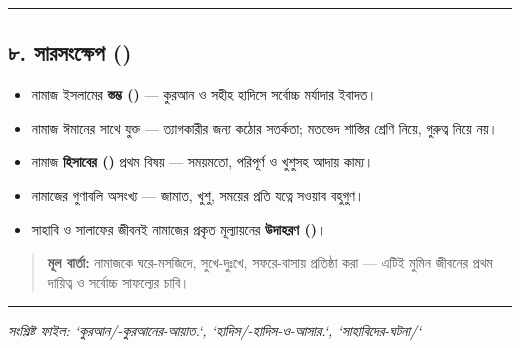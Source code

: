 \medskip\hrule\medskip

\subsection*{৮. সারসংক্ষেপ ()}

\begin{itemize}
\item নামাজ ইসলামের \textbf{স্তম্ভ ()} — কুরআন ও সহীহ হাদিসে সর্বোচ্চ মর্যাদার ইবাদত।
\item নামাজ ঈমানের সাথে যুক্ত — ত্যাগকারীর জন্য কঠোর সতর্কতা; মতভেদ শাস্তির শ্রেণি নিয়ে, গুরুত্ব নিয়ে নয়।
\item নামাজ \textbf{হিসাবের ()} প্রথম বিষয় — সময়মতো, পরিপূর্ণ ও খুশুসহ আদায় কাম্য।
\item নামাজের গুণাবলি অসংখ্য — জামাত, খুশু, সময়ের প্রতি যত্নে সওয়াব বহুগুণ।
\item সাহাবি ও সালাফের জীবনই নামাজের প্রকৃত মূল্যায়নের \textbf{উদাহরণ ()}।
\end{itemize}
\begin{quote}
\textbf{মূল বার্তা:} নামাজকে ঘরে-মসজিদে, সুখে-দুঃখে, সফরে-বাসায় প্রতিষ্ঠা করা — এটিই মুমিন জীবনের প্রথম দায়িত্ব ও সর্বোচ্চ সাফল্যের চাবি।
\end{quote}

\medskip\hrule\medskip
\textit{সংশ্লিষ্ট ফাইল: `কুরআন/-কুরআনের-আয়াত.`, `হাদিস/-হাদিস-ও-আসার.`, `সাহাবিদের-ঘটনা/`}



